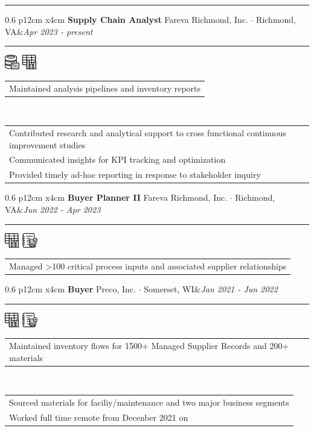 \documentclass[10pt,A4]{article}
\newcommand{\tzlarrow}{(0,0) -- (0.2,0) -- (0.3,0.2) -- (0.2,0.4) -- (0,0.4) -- (0.1,0.2) -- cycle;}
\newcommand{\larrow}[1]
{\begin{tikzpicture}[scale=0.58]
	 \filldraw[fill=#1!100,draw=#1!100!black]  \tzlarrow
 \end{tikzpicture}
}
\newcommand{\cvevent}[5]
{
\vspace{8pt}
	\begin{tabular*}{0.6\linewidth}{ p{12cm} x{4cm}}
\textbf{#2} \hspace{4pt} {#3}&\textit{#1}\\[4pt]
	\end{tabular*}
        
        \vspace{-6pt}

\textcolor{softcol}{\hrule}
\vspace{-2pt}
\hspace{14.3cm}
#4 \\[-18pt-6pt]
\vspace{6pt}
	\begin{tabular*}{1\textwidth}{l}
	\vspace{-0.85cm} \larrow{sectcol} #5\\[4.5pt]
	\end{tabular*}
}
\newcommand{\cveventshort}[5]
{
\vspace{8pt}
	\begin{tabular*}{0.6\linewidth}{ p{12cm} x{4cm}}
\textbf{#2} \hspace{4pt} {#3}&\textit{#1}\\[4pt]
	\end{tabular*}
        
        \vspace{-6pt}
       
\textcolor{softcol}{\hrule}
\vspace{-2pt}
\hspace{14.3cm}
#4 \\[-18pt-6pt]
\vspace{6pt}
	\begin{tabular*}{1\textwidth}{l}
	\vspace{-0.85cm} \larrow{sectcol} #5\\[6pt]
	\end{tabular*}
\vspace{-3pt}
}
\newcommand{\oneextra}[1]
{ \vspace{-0.85cm+24pt} \\
\begin{tabular*}{1\textwidth}{l}
		 \larrow{softcol}  #1\\[6pt]
	\end{tabular*}
\vspace{-3pt}
}
\newcommand{\twoextra}[2]
{ \vspace{-0.85cm+24pt} \\
\begin{tabular*}{1\textwidth}{l}
		 \larrow{softcol}  #1\\[4.5pt]
		 \larrow{softcol}  #2\\[6pt]
	\end{tabular*}
\vspace{-3pt}
}
\newcommand{\threeextra}[3]
{ \vspace{-0.85cm+24pt} \\
\begin{tabular*}{1\textwidth}{l}
		 \larrow{softcol}  #1\\[4.5pt]
		 \larrow{softcol}  #2\\[4.5pt]
		 \larrow{softcol}  #3\\[6pt]
	\end{tabular*}
\vspace{-3pt}
}
\begin{document}
\begin{minipage}[c][0.5\textheight][t]{\linewidth}
\vspace{3.3cm}
  \hspace{18.5cm}
\textcolor{sectcol}{\rule[-3.4cm]{2pt}{7.2cm}}
\hspace{12pt}

\vspace{-9.8cm}
\hspace{26pt}
\parbox[c]{0.8\linewidth}{
%
  \cvevent{Apr 2023 - present}{Supply Chain Analyst}{Fareva Richmond, Inc.  $\cdot$  Richmond, VA}
   {\hspace{22.2222pt}\includegraphics[height=18pt]{img/DBgraphic} \hspace{2pt} \includegraphics[height=18pt]{img/chartgraphic}}
{Maintained analysis pipelines and inventory reports}
\threeextra{Contributed research and analytical support to cross functional continuous improvement studies}{Communicated insights for KPI tracking and optimization}{Provided timely ad-hoc reporting in response to stakeholder inquiry}


%
  \cveventshort{Jun 2022 - Apr 2023}{Buyer Planner II}{Fareva Richmond, Inc.  $\cdot$  Richmond, VA}
{ \hspace{20.2222pt} \includegraphics[height=18pt]{img/chartgraphic} \hspace{2pt} \includegraphics[height=18pt]{img/notebookgraphic}}
{Managed >100 critical process inputs and associated supplier relationships}



%
  \cvevent{Jan 2021 - Jun 2022}{Buyer}{Preco, Inc.  $\cdot$  Somerset, WI}
{ \hspace{20.2222pt} \includegraphics[height=18pt]{img/chartgraphic} \hspace{2pt} \includegraphics[height=18pt]{img/notebookgraphic}}
{Maintained inventory flows for 1500+ Managed Supplier Records and 200+ materials}
  \twoextra{Sourced materials for faciliy/maintenance and two major business segments}{Worked full time remote from Decenber 2021 on}

}
\end{minipage}
\end{document}
